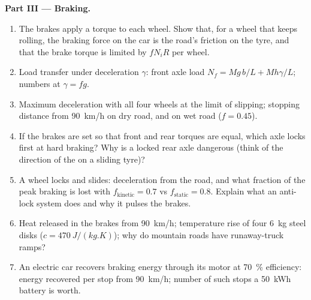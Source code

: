 \begin{problem}
\medskip
\noindent\textbf{Part III --- Braking.}
\begin{enumerate}[resume]
  \item The brakes apply a torque to each wheel. Show that, for a wheel
        that keeps rolling, the braking force on the car is the
        road's friction on the tyre, and that the brake torque is
        limited by $fN_iR$ per wheel.
  \item Load transfer under deceleration $\gamma$: front axle load
        $N_f = Mg\,b/L + Mh\gamma/L$; numbers at $\gamma = fg$.
  \item Maximum deceleration with all four wheels at the limit of
        slipping; stopping distance from \qty{90}{km/h} on dry road, and
        on wet road ($f = 0.45$).
  \item If the brakes are set so that front and rear torques are equal,
        which axle locks first at hard braking? Why is a locked rear
        axle dangerous (think of the direction of the 
        on a sliding tyre)?
  \item A wheel locks and slides: deceleration from the road, and what
        fraction of the peak braking is lost with $f_{\text{kinetic}} =
        0.7$ vs $f_{\text{static}} = 0.8$. Explain what an anti-lock
        system does and why it pulses the brakes.
  \item Heat released in the brakes from \qty{90}{km/h}; temperature
        rise of four \qty{6}{kg} steel disks ($c = \qty{470}{J/(kg.K)}$);
        why do mountain roads have runaway-truck ramps?
  \item An electric car recovers braking energy through its motor at
        \qty{70}{\%} efficiency: energy recovered per stop from
        \qty{90}{km/h}; number of such stops a \qty{50}{kWh} battery is
        worth.
\end{enumerate}


\end{problem}
